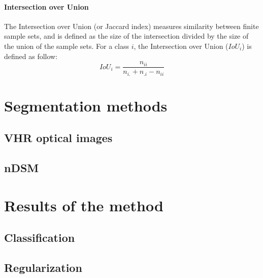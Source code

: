 \paragraph{Intersection over Union \\}
The Intersection over Union (or Jaccard index) \citep{jaccard1912distribution} measures similarity between finite sample sets, and is defined as the size of the intersection divided by the size of the union of the sample sets. For a class $i$, the Intersection over Union ($IoU_{i}$) is defined as follow:
\begin{equation}
IoU_{i}=\frac{n_{ii}}{n_{i.}+n_{.i}-n_{ii}}
\end{equation}


\section{Segmentation methods}

\subsection{VHR optical images}


\subsection{nDSM}



\section{Results of the method}
\subsection{Classification}
\subsection{Regularization}

\stopcontents[chapters]